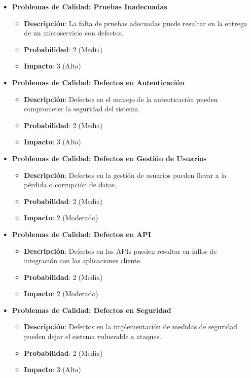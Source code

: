 \begin{itemize}
    \item \textbf{Problemas de Calidad: Pruebas Inadecuadas}
          \begin{itemize}
              \item \textbf{Descripción}: La falta de pruebas adecuadas puede resultar en la entrega de un microservicio con defectos.
              \item \textbf{Probabilidad}: 2 (Media)
              \item \textbf{Impacto}: 3 (Alto)
          \end{itemize}

    \item \textbf{Problemas de Calidad: Defectos en Autenticación}
          \begin{itemize}
              \item \textbf{Descripción}: Defectos en el manejo de la autenticación pueden comprometer la seguridad del sistema.
              \item \textbf{Probabilidad}: 2 (Media)
              \item \textbf{Impacto}: 3 (Alto)
          \end{itemize}

    \item \textbf{Problemas de Calidad: Defectos en Gestión de Usuarios}
          \begin{itemize}
              \item \textbf{Descripción}: Defectos en la gestión de usuarios pueden llevar a la pérdida o corrupción de datos.
              \item \textbf{Probabilidad}: 2 (Media)
              \item \textbf{Impacto}: 2 (Moderado)
          \end{itemize}

    \item \textbf{Problemas de Calidad: Defectos en API}
          \begin{itemize}
              \item \textbf{Descripción}: Defectos en las APIs pueden resultar en fallos de integración con las aplicaciones cliente.
              \item \textbf{Probabilidad}: 2 (Media)
              \item \textbf{Impacto}: 2 (Moderado)
          \end{itemize}

    \item \textbf{Problemas de Calidad: Defectos en Seguridad}
          \begin{itemize}
              \item \textbf{Descripción}: Defectos en la implementación de medidas de seguridad pueden dejar el sistema vulnerable a ataques.
              \item \textbf{Probabilidad}: 2 (Media)
              \item \textbf{Impacto}: 3 (Alto)
          \end{itemize}


\end{itemize}
